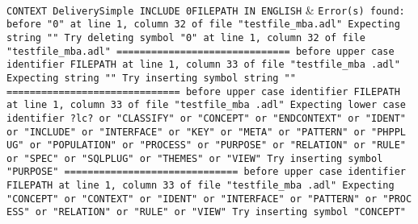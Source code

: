 \\\hline
\texttt{CONTEXT DeliverySimple INCLUDE 0FILEPATH IN ENGLISH} & \texttt{Error(s) found:\newline
  \newline
  before "0" at line 1, column 32 of file "testfile\_mba.adl"\newline
  Expecting string ""\newline
  Try deleting symbol "0" at line 1, column 32 of file "testfile\_mba.adl"\newline
  \newline
  ==============================\newline
  \newline
  before upper case identifier FILEPATH at line 1, column 33 of file "testfile\_mba\newline
  .adl"\newline
  Expecting string ""\newline
  Try inserting symbol string ""\newline
  \newline
  ==============================\newline
  \newline
  before upper case identifier FILEPATH at line 1, column 33 of file "testfile\_mba\newline
  .adl"\newline
  Expecting lower case identifier ?lc? or "CLASSIFY" or "CONCEPT" or "ENDCONTEXT"\newline
  or "IDENT" or "INCLUDE" or "INTERFACE" or "KEY" or "META" or "PATTERN" or "PHPPL\newline
  UG" or "POPULATION" or "PROCESS" or "PURPOSE" or "RELATION" or "RULE" or "SPEC"\newline
  or "SQLPLUG" or "THEMES" or "VIEW"\newline
  Try inserting symbol "PURPOSE"\newline
  \newline
  ==============================\newline
  \newline
  before upper case identifier FILEPATH at line 1, column 33 of file "testfile\_mba\newline
  .adl"\newline
  Expecting "CONCEPT" or "CONTEXT" or "IDENT" or "INTERFACE" or "PATTERN" or "PROC\newline
  ESS" or "RELATION" or "RULE" or "VIEW"\newline
  Try inserting symbol "CONCEPT"\newline
}
